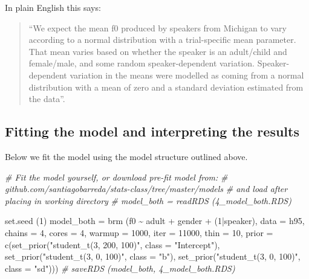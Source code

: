 \documentclass[
]{book}
\newenvironment{Shaded}{\begin{snugshade}}{\end{snugshade}}
\newcommand{\AttributeTok}[1]{\textcolor[rgb]{0.77,0.63,0.00}{#1}}
\newcommand{\CommentTok}[1]{\textcolor[rgb]{0.56,0.35,0.01}{\textit{#1}}}
\newcommand{\DecValTok}[1]{\textcolor[rgb]{0.00,0.00,0.81}{#1}}
\newcommand{\FunctionTok}[1]{\textcolor[rgb]{0.00,0.00,0.00}{#1}}
\newcommand{\NormalTok}[1]{#1}
\newcommand{\OtherTok}[1]{\textcolor[rgb]{0.56,0.35,0.01}{#1}}
\newcommand{\SpecialCharTok}[1]{\textcolor[rgb]{0.00,0.00,0.00}{#1}}
\newcommand{\StringTok}[1]{\textcolor[rgb]{0.31,0.60,0.02}{#1}}
\begin{document}
In plain English this says:

\begin{quote}
``We expect the mean f0 produced by speakers from Michigan to vary according to a normal distribution with a trial-specific mean parameter. That mean varies based on whether the speaker is an adult/child and female/male, and some random speaker-dependent variation. Speaker-dependent variation in the means were modelled as coming from a normal distribution with a mean of zero and a standard deviation estimated from the data''.
\end{quote}

\hypertarget{fitting-the-model-and-interpreting-the-results}{%
\subsection{Fitting the model and interpreting the results}\label{fitting-the-model-and-interpreting-the-results}}

Below we fit the model using the model structure outlined above.

\begin{Shaded}
\begin{Highlighting}[]
\CommentTok{\# Fit the model yourself, or download pre{-}fit model from: }
\CommentTok{\# github.com/santiagobarreda/stats{-}class/tree/master/models}
\CommentTok{\# and load after placing in working directory}
\CommentTok{\#  model\_both = readRDS (\textquotesingle{}4\_model\_both.RDS\textquotesingle{})}

\FunctionTok{set.seed}\NormalTok{ (}\DecValTok{1}\NormalTok{)}
\NormalTok{model\_both }\OtherTok{=}  
  \FunctionTok{brm}\NormalTok{ (f0 }\SpecialCharTok{\textasciitilde{}}\NormalTok{ adult }\SpecialCharTok{+}\NormalTok{ gender }\SpecialCharTok{+}\NormalTok{ (}\DecValTok{1}\SpecialCharTok{|}\NormalTok{speaker), }\AttributeTok{data =}\NormalTok{ h95, }\AttributeTok{chains =} \DecValTok{4}\NormalTok{, }\AttributeTok{cores =} \DecValTok{4}\NormalTok{, }
       \AttributeTok{warmup =} \DecValTok{1000}\NormalTok{, }\AttributeTok{iter =} \DecValTok{11000}\NormalTok{, }\AttributeTok{thin =} \DecValTok{10}\NormalTok{, }
       \AttributeTok{prior =} \FunctionTok{c}\NormalTok{(}\FunctionTok{set\_prior}\NormalTok{(}\StringTok{"student\_t(3, 200, 100)"}\NormalTok{, }\AttributeTok{class =} \StringTok{"Intercept"}\NormalTok{),}
                              \FunctionTok{set\_prior}\NormalTok{(}\StringTok{"student\_t(3, 0, 100)"}\NormalTok{, }\AttributeTok{class =} \StringTok{"b"}\NormalTok{),}
                              \FunctionTok{set\_prior}\NormalTok{(}\StringTok{"student\_t(3, 0, 100)"}\NormalTok{, }\AttributeTok{class =} \StringTok{"sd"}\NormalTok{))) }
\CommentTok{\#  saveRDS (model\_both, \textquotesingle{}4\_model\_both.RDS\textquotesingle{})}
\end{Highlighting}
\end{Shaded}
\end{document}
